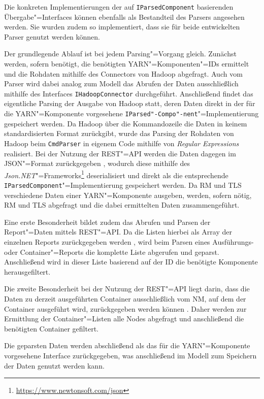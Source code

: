 Die konkreten Implementierungen der auf \texttt{IParsedComponent} basierenden Übergabe"=Interfaces können ebenfalls als Bestandteil des Parsers angesehen werden.
Sie wurden zudem so implementiert, dass sie für beide entwickelten Parser genutzt werden können.

Der grundlegende Ablauf ist bei jedem Parsing"=Vorgang gleich.
Zunächst werden, sofern benötigt, die benötigten YARN"=Komponenten"=IDs ermittelt und die Rohdaten mithilfe des Connectors von Hadoop abgefragt.
Auch vom Parser wird dabei analog zum Modell das Abrufen der Daten ausschließlich mithilfe des Interfaces \texttt{IHadoopConnector} durchgeführt.
Anschließend findet das eigentliche Parsing der Ausgabe von Hadoop statt, deren Daten direkt in der für die YARN"=Komponente vorgesehene \texttt{IParsed"-Compo"-nent}"=Implementierung gespeichert werden.
Da Hadoop über die Kommandozeile die Daten in keinem standardisierten Format zurückgibt, wurde das Parsing der Rohdaten von Hadoop beim \texttt{CmdParser} in eigenem Code mithilfe von \emph{Regular Expressions} realisiert.
Bei der Nutzung der REST"=API werden die Daten dagegen im JSON"=Format zurückgegeben \cite{HadoopYarnTlServer271,HadoopRmApi271,HadoopNmApi271}, wodurch diese mithilfe des \emph{Json.NET}"=Frameworks\footnote{\url{https://www.newtonsoft.com/json}} deserialisiert und direkt als die entsprechende \texttt{IParsedComponent}"=Implementierung gespeichert werden.
Da \ac{RM} und \ac{TLS} verschiedene Daten einer YARN"=Komponente ausgeben, werden, sofern nötig, \ac{RM} und \ac{TLS} abgefragt und die dabei ermittelten Daten zusammengeführt.

Eine erste Besonderheit bildet zudem das Abrufen und Parsen der Report"=Daten mittels REST"=API.
Da die Listen hierbei als Array der einzelnen Reports zurückgegeben werden \cite{HadoopYarnTlServer271,HadoopRmApi271,HadoopNmApi271}, wird beim Parsen eines Ausführungs- oder Container"=Reports die komplette Liste abgerufen und geparst.
Anschließend wird in dieser Liste basierend auf der ID die benötigte Komponente herausgefiltert.

Die zweite Besonderheit bei der Nutzung der REST"=API liegt darin, dass die Daten zu derzeit ausgeführten Container ausschließlich vom \ac{NM}, auf dem der Container ausgeführt wird, zurückgegeben werden können \cite{HadoopRmApi271,HadoopNmApi271}.
Daher werden zur Ermittlung der Container"=Listen alle Nodes abgefragt und anschließend die benötigten Container gefiltert.

Die geparsten Daten werden abschließend als das für die YARN"=Komponente vorgesehene Interface zurückgegeben, was anschließend im Modell zum Speichern der Daten genutzt werden kann.

